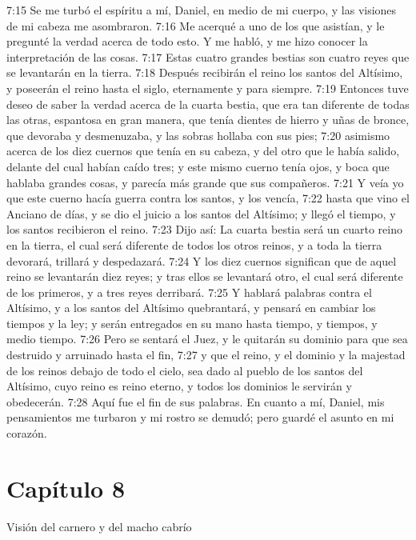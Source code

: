 7:15 Se me turbó el espíritu a mí, Daniel, en medio de mi cuerpo, y las visiones de mi cabeza me asombraron. 
7:16 Me acerqué a uno de los que asistían, y le pregunté la verdad acerca de todo esto. Y me habló, y me hizo conocer la interpretación de las cosas. 
7:17 Estas cuatro grandes bestias son cuatro reyes que se levantarán en la tierra. 
7:18 Después recibirán el reino los santos del Altísimo, y poseerán el reino hasta el siglo, eternamente y para siempre. 
7:19 Entonces tuve deseo de saber la verdad acerca de la cuarta bestia, que era tan diferente de todas las otras, espantosa en gran manera, que tenía dientes de hierro y uñas de bronce, que devoraba y desmenuzaba, y las sobras hollaba con sus pies; 
7:20 asimismo acerca de los diez cuernos que tenía en su cabeza, y del otro que le había salido, delante del cual habían caído tres; y este mismo cuerno tenía ojos, y boca que hablaba grandes cosas, y parecía más grande que sus compañeros. 
7:21 Y veía yo que este cuerno hacía guerra contra los santos, y los vencía, 
7:22 hasta que vino el Anciano de días, y se dio el juicio a los santos del Altísimo;  y llegó el tiempo, y los santos recibieron el reino. 
7:23 Dijo así: La cuarta bestia será un cuarto reino en la tierra, el cual será diferente de todos los otros reinos, y a toda la tierra devorará, trillará y despedazará. 
7:24 Y los diez cuernos significan que de aquel reino se levantarán diez reyes; y tras ellos se levantará otro, el cual será diferente de los primeros, y a tres reyes derribará. 
7:25 Y hablará palabras contra el Altísimo, y a los santos del Altísimo quebrantará, y pensará en cambiar los tiempos y la ley; y serán entregados en su mano hasta tiempo, y tiempos, y medio tiempo. 
7:26 Pero se sentará el Juez, y le quitarán su dominio para que sea destruido y arruinado hasta el fin, 
7:27 y que el reino, y el dominio y la majestad de los reinos debajo de todo el cielo, sea dado al pueblo de los santos del Altísimo,  cuyo reino es reino eterno, y todos los dominios le servirán y obedecerán. 
7:28 Aquí fue el fin de sus palabras. En cuanto a mí, Daniel, mis pensamientos me turbaron y mi rostro se demudó; pero guardé el asunto en mi corazón. 
\section*{Capítulo 8}
Visión del carnero y del macho cabrío 
 
